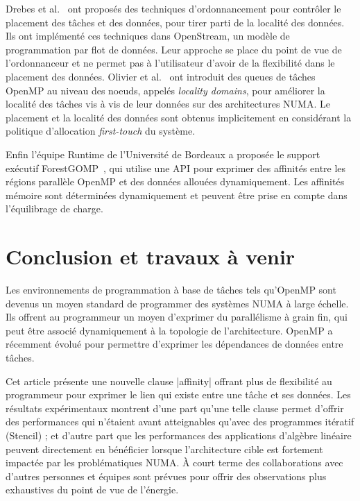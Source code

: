 \documentclass[parallelisme]{compas2017}
\begin{document}
Drebes et al.~\cite{Drebes:2014:TDS:2658949.2641764} ont proposés des techniques
d'ordonnancement pour contrôler le placement des tâches et des données, pour
tirer parti de la localité des données. Ils ont implémenté ces techniques
dans OpenStream, un modèle de programmation par flot de données.
Leur approche se place du point de vue de l'ordonnanceur et ne permet pas à
l'utilisateur d'avoir de la flexibilité dans le placement des données.
Olivier et al.~\cite{Olivier:2012:CMW:2388996.2389085}
ont introduit des queues de tâches OpenMP au niveau des noeuds, appelés
\textit{locality domains}, pour améliorer la localité des tâches vis à vis de
leur données sur des architectures NUMA.
Le placement et la localité des données sont obtenus implicitement en considérant la politique
d'allocation \emph{first-touch} du système.


Enfin l'équipe Runtime de l'Université de Bordeaux a proposée le support
exécutif ForestGOMP~\cite{BroFurGogWacNam10IJPP}, qui utilise une API pour
exprimer des affinités entre les régions parallèle OpenMP et des données allouées
dynamiquement. Les affinités mémoire sont déterminées dynamiquement et peuvent
être prise en compte dans l'équilibrage de charge.


\section{Conclusion et travaux à venir}
\label{sec:related_work}

Les environnements de programmation à base de tâches tels qu'OpenMP sont devenus
un moyen standard de programmer des systèmes NUMA à large échelle.
Ils offrent au programmeur un moyen d'exprimer du parallélisme à grain fin,
qui peut être associé dynamiquement à la topologie de l'architecture.
OpenMP a récemment évolué pour permettre d'exprimer les dépendances de données
entre tâches.

Cet article présente une nouvelle clause |affinity| offrant plus de flexibilité
au programmeur pour exprimer le lien qui existe entre une tâche et ses données.
Les résultats expérimentaux montrent d'une part qu'une telle clause permet
d'offrir des performances qui n'étaient avant atteignables qu'avec des programmes
itératif (Stencil) ; et d'autre part que les performances des
applications d'algèbre linéaire peuvent directement en bénéficier lorsque
l'architecture cible est fortement impactée par les problématiques NUMA.
À court terme des collaborations avec d'autres personnes et équipes sont prévues
pour offrir des observations plus exhaustives du point de vue de l'énergie.
\end{document}
